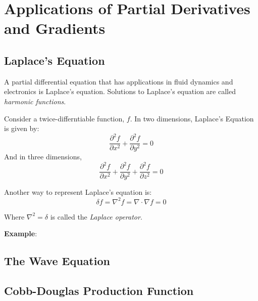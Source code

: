 \section{Applications of Partial Derivatives and Gradients}

\subsection{Laplace's Equation}
A partial differential equation that has applications in fluid dynamics and electronics is Laplace's equation. Solutions to Laplace's equation are called \textit{harmonic functions}. 

\begin{mdframed}[style = important, frametitle = {Laplace's Equation}]
Consider a twice-differntiable function, $f$. In two dimensions, Laplace's Equation is given by:
$$ \frac{\partial ^2 f}{\partial x^2} + \frac{\partial^2 f}{\partial y^2} = 0$$
And in three dimensions, 
$$\frac{\partial ^2 f}{\partial x^2} + \frac{\partial ^2 f}{\partial y^2} + \frac{\partial ^2 f}{\partial z^2} = 0$$
\end{mdframed}

Another way to represent Laplace's equation is:
$$\delta f = \nabla^2 f = \nabla \cdot \nabla f = 0$$

Where $\nabla ^2 = \delta$ is called the \textit{Laplace operator}. 

\textbf{Example}:

\subsection{The Wave Equation}

\subsection{Cobb-Douglas Production Function}